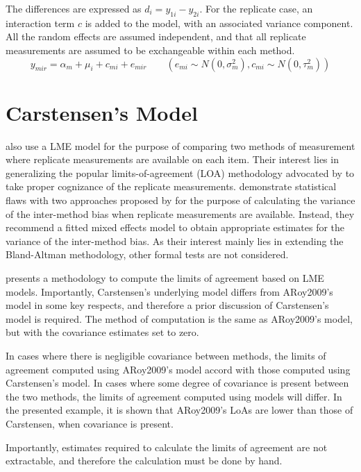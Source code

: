 \documentclass[12pt, a4paper]{report}
\theoremstyle{plain}
\theoremstyle{definition}
\theoremstyle{remark}
\begin{document}
	The differences are expressed as $d_{i} = y_{1i} - y_{2i}$. For the replicate case, an interaction term $c$ is added to the model, with an associated variance component. All the random effects are assumed independent, and that all replicate measurements are assumed to be exchangeable within each method.
	\begin{equation}
	y_{mir}  = \alpha_{m} + \mu_{i} + c_{mi} + e_{mir} \qquad ( e_{mi}
	\sim N(0,\sigma^{2}_{m}), c_{mi} \sim N(0,\tau^{2}_{m}))
	\end{equation}
	\section{Carstensen's Model}
	\cite{BXC2008} also use a LME model for the purpose of comparing two methods of measurement where replicate measurements are available on each item. Their interest lies in generalizing the popular limits-of-agreement (LOA) methodology advocated by \citet{BA86} to take proper cognizance of the replicate measurements. \citet{BXC2008} demonstrate statistical flaws with two approaches proposed by \citet{BA99} for the purpose of calculating the variance of the inter-method bias when replicate measurements are available. Instead, they recommend a fitted mixed effects model to obtain appropriate estimates for the variance of the inter-method bias. As their interest mainly lies in extending the Bland-Altman methodology, other formal tests are not considered.
	
	
	\citet{BXC2008} presents a methodology to compute the limits of
	agreement based on LME models. Importantly, Carstensen's underlying model differs from ARoy2009's model in some key respects, and therefore a prior discussion of Carstensen's model is required. The method of computation is the
	same as ARoy2009's model, but with the covariance estimates set to zero.
	
	In cases where there is negligible covariance between methods, the limits of agreement computed using ARoy2009's model accord with those computed using Carstensen's model. In cases where some degree of
	covariance is present between the two methods, the limits of agreement computed using models will differ. In the presented
	example, it is shown that ARoy2009's LoAs are lower than those of Carstensen, when covariance is present.
	
	Importantly, estimates required to calculate the limits of agreement are not extractable, and therefore the calculation must
	be done by hand.
	
\end{document}
